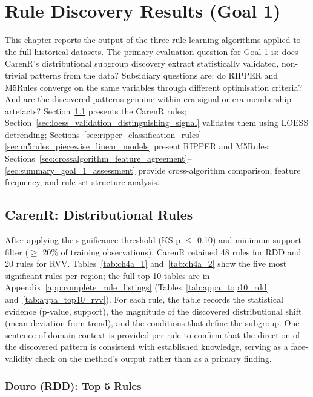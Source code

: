 
\chapter{Rule Discovery Results (Goal 1)}\label{ch:goal_1_rule_extraction}

This chapter reports the output of the three rule-learning algorithms applied to the full historical datasets. The primary evaluation question for Goal 1 is: does CarenR's distributional subgroup discovery extract statistically validated, non-trivial patterns from the data? Subsidiary questions are: do RIPPER and M5Rules converge on the same variables through different optimisation criteria? And are the discovered patterns genuine within-era signal or era-membership artefacts? Section~\ref{sec:carenr_distributional_rules} presents the CarenR rules; Section~\ref{sec:loess_validation_distinguishing_signal} validates them using LOESS detrending; Sections~\ref{sec:ripper_classification_rules}--\ref{sec:m5rules_piecewise_linear_models} present RIPPER and M5Rules; Sections~\ref{sec:crossalgorithm_feature_agreement}--\ref{sec:summary_goal_1_assessment} provide cross-algorithm comparison, feature frequency, and rule set structure analysis.


\section{CarenR: Distributional Rules}\label{sec:carenr_distributional_rules}

After applying the significance threshold (KS p $\leq$ 0.10) and minimum support filter ($\geq$ 20\% of training observations), CarenR retained 48 rules for RDD and 20 rules for RVV. Tables~\ref{tab:ch4a_1} and~\ref{tab:ch4a_2} show the five most significant rules per region; the full top-10 tables are in Appendix~\ref{app:complete_rule_listings} (Tables~\ref{tab:appa_top10_rdd} and~\ref{tab:appa_top10_rvv}). For each rule, the table records the statistical evidence (p-value, support), the magnitude of the discovered distributional shift (mean deviation from trend), and the conditions that define the subgroup. One sentence of domain context is provided per rule to confirm that the direction of the discovered pattern is consistent with established knowledge, serving as a face-validity check on the method's output rather than as a primary finding.


\subsection{Douro (RDD): Top 5 Rules}\label{sub:douro_rdd_top_10}

